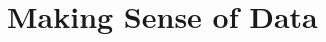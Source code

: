 \documentclass[../main]{subfiles}
\begin{document}
\chapter{Making Sense of Data} \label{chp:}








\end{document}
